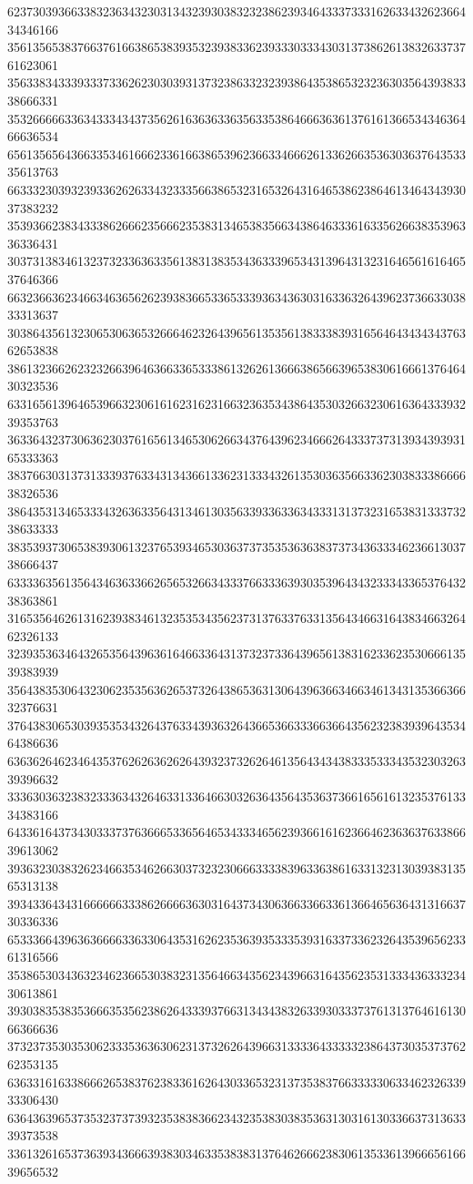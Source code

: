 62373039366338323634323031343239303832323862393464333733316263343262366434346166
35613565383766376166386538393532393833623933303334303137386261383263373761623061
35633834333933373362623030393137323863323239386435386532323630356439383338666331
35326666633634333434373562616363633635633538646663636137616136653434636466636534
65613565643663353461666233616638653962366334666261336266353630363764353335613763
66333230393239336262633432333566386532316532643164653862386461346434393037383232
35393662383433386266623566623538313465383566343864633361633562663835396336336431
30373138346132373233636335613831383534363339653431396431323164656161646537646366
66323663623466346365626239383665336533393634363031633632643962373663303833313637
30386435613230653063653266646232643965613535613833383931656464343434376362653838
38613236626232326639646366336533386132626136663865663965383061666137646430323536
63316561396465396632306161623162316632363534386435303266323061636433393239353763
36336432373063623037616561346530626634376439623466626433373731393439393165333363
38376630313731333937633431343661336231333432613530363566336230383338666638326536
38643531346533343263633564313461303563393363363433313137323165383133373238633333
38353937306538393061323765393465303637373535363638373734363334623661303738666437
63333635613564346363366265653266343337663336393035396434323334336537643238363861
31653564626131623938346132353534356237313763376331356434663164383466326462326133
32393536346432653564396361646633643137323733643965613831623362353066613539383939
35643835306432306235356362653732643865363130643963663466346134313536636632376631
37643830653039353534326437633439363264366536633366366435623238393964353464386636
63636264623464353762626362626439323732626461356434343833353334353230326339396632
33363036323832333634326463313364663032636435643536373661656161323537613334383166
64336164373430333737636665336564653433346562393661616236646236363763386639613062
39363230383262346635346266303732323066633338396336386163313231303938313565313138
39343364343166666633386266663630316437343063663366336136646563643131663730336336
65333664396363666633633064353162623536393533353931633733623264353965623361316566
35386530343632346236653038323135646634356234396631643562353133343633323430613861
39303835383536663535623862643339376631343438326339303337376131376461613066366636
37323735303530623335363630623137326264396631333364333332386437303537376262353135
63633161633866626538376238336162643033653231373538376633333063346232633933306430
63643639653735323737393235383836623432353830383536313031613033663731363339373538
33613261653736393436663938303463353838313764626662383061353361396665616639656532
